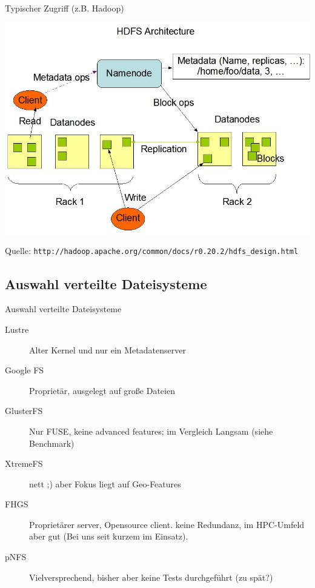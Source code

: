 \documentclass[hyperref={xetex}]{beamer}
\begin{document}
\begin{frame}{Typischer Zugriff (z.B. Hadoop)}
	\begin{center}
	\includegraphics[scale=0.2]{images/hdfsarchitecture.jpg}
	\end{center}
	\small
	Quelle: \texttt{http://hadoop.apache.org/common/docs/r0.20.2/hdfs\_design.html}
\end{frame}

\subsection{Auswahl verteilte Dateisysteme}
\begin{frame}{Auswahl verteilte Dateisysteme}
	\begin{description}	
        \item [Lustre]  Alter Kernel und nur ein Metadatenserver \\
        \item [Google FS] Propriet\"ar, ausgelegt auf große Dateien \\
        \item [GlusterFS]  Nur FUSE, keine advanced features; im Vergleich Langsam (siehe Benchmark)\\
        \item [XtremeFS] nett ;) aber Fokus liegt auf Geo-Features\\
        \item [FHGS]  Propriet\"arer server, Opensource client. keine Redundanz, im HPC-Umfeld aber gut (Bei uns seit kurzem im Einsatz).
        \item [pNFS] Vielversprechend, bisher aber keine Tests durchgeführt (zu spät?)
	\end{description}
\end{frame}
\end{document}

